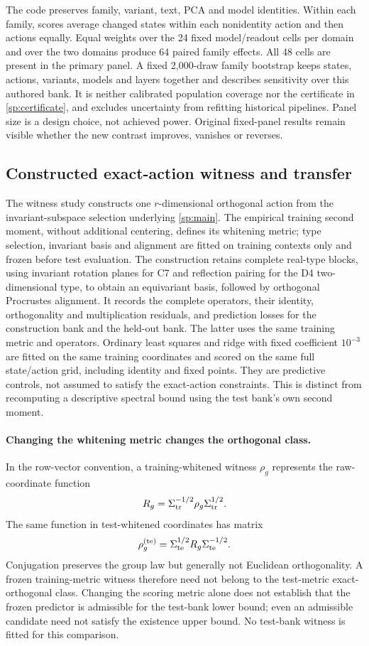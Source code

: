 The code preserves family, variant, text, PCA and model identities. Within each family, scores average changed states within each nonidentity action and then actions equally. Equal weights over the 24 fixed model/readout cells per domain and over the two domains produce 64 paired family effects. All 48 cells are present in the primary panel. A fixed 2,000-draw family bootstrap keeps states, actions, variants, models and layers together and describes sensitivity over this authored bank. It is neither calibrated population coverage nor the certificate in \cref{sp:certificate}, and excludes uncertainty from refitting historical pipelines. Panel size is a design choice, not achieved power. Original fixed-panel results remain visible whether the new contrast improves, vanishes or reverses.

\subsection{Constructed exact-action witness and transfer}
The witness study constructs one $r$-dimensional orthogonal action from the invariant-subspace selection underlying \cref{sp:main}. The empirical training second moment, without additional centering, defines its whitening metric; type selection, invariant basis and alignment are fitted on training contexts only and frozen before test evaluation. The construction retains complete real-type blocks, using invariant rotation planes for C7 and reflection pairing for the D4 two-dimensional type, to obtain an equivariant basis, followed by orthogonal Procrustes alignment. It records the complete operators, their identity, orthogonality and multiplication residuals, and prediction losses for the construction bank and the held-out bank. The latter uses the same training metric and operators. Ordinary least squares and ridge with fixed coefficient $10^{-3}$ are fitted on the same training coordinates and scored on the same full state/action grid, including identity and fixed points. They are predictive controls, not assumed to satisfy the exact-action constraints. This is distinct from recomputing a descriptive spectral bound using the test bank's own second moment.

\paragraph{Changing the whitening metric changes the orthogonal class.}
\label{app:metric-conjugation}
In the row-vector convention, a training-whitened witness $\rho_g$ represents the raw-coordinate function
\[
 R_g=\Sigma_{\rm tr}^{-1/2}\rho_g\Sigma_{\rm tr}^{1/2}.
\]
The same function in test-whitened coordinates has matrix
\[
 \rho_g^{(\rm te)}=\Sigma_{\rm te}^{1/2}R_g\Sigma_{\rm te}^{-1/2}.
\]
Conjugation preserves the group law but generally not Euclidean orthogonality. A frozen training-metric witness therefore need not belong to the test-metric exact-orthogonal class. Changing the scoring metric alone does not establish that the frozen predictor is admissible for the test-bank lower bound; even an admissible candidate need not satisfy the existence upper bound. No test-bank witness is fitted for this comparison.

